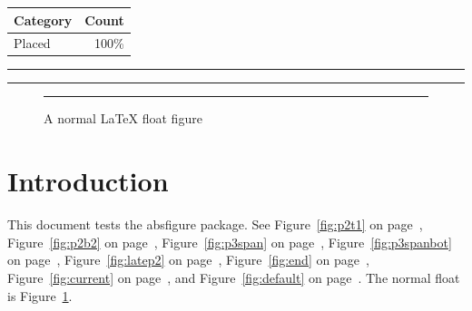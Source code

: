 \documentclass[twocolumn]{article}
\begin{document}
\begin{abstable}[page=end]
  \centering
  \caption{Table placed at the end of the document}
  \label{tab:end}
  \begin{tabular}{lr}
    \hline
    Category & Count \\
    \hline
    Placed   & 100\% \\
    \hline
  \end{tabular}
\end{abstable}


\begin{absfigure}[page=current, pos=b, col=2]
  \centering
  \rule{0.9\columnwidth}{2cm}
  \caption{Figure via page=current (should be page~1)}
  \label{fig:current}
\end{absfigure}

\begin{absfigure}[pos=t, col=2]
  \centering
  \rule{0.9\columnwidth}{1.5cm}
  \caption{Figure with default page (should be page~1)}
  \label{fig:default}
\end{absfigure}


\begin{figure}[t]
  \centering
  \rule{0.9\columnwidth}{2cm}
  \caption{A normal LaTeX float figure}
  \label{fig:normal}
\end{figure}


\section{Introduction}

This document tests the \textsf{absfigure} package.
See Figure~\ref{fig:p2t1} on page~\pageref{fig:p2t1},
Figure~\ref{fig:p2b2} on page~\pageref{fig:p2b2},
Figure~\ref{fig:p3span} on page~\pageref{fig:p3span},
Figure~\ref{fig:p3spanbot} on page~\pageref{fig:p3spanbot},
Figure~\ref{fig:latep2} on page~\pageref{fig:latep2},
Figure~\ref{fig:end} on page~\pageref{fig:end},
Figure~\ref{fig:current} on page~\pageref{fig:current},
and Figure~\ref{fig:default} on page~\pageref{fig:default}.
The normal float is Figure~\ref{fig:normal}.
\end{document}
